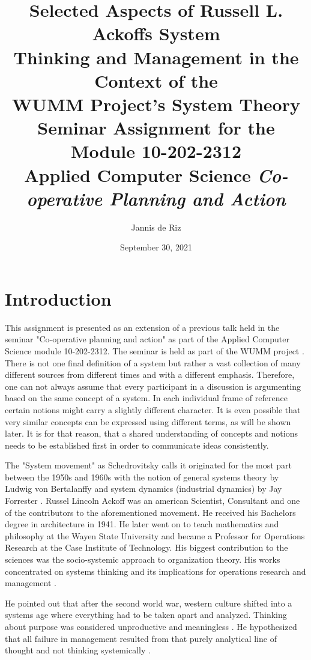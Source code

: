 \documentclass[a4paper,11pt]{article}
\title{Selected Aspects of Russell L. Ackoffs System\\ Thinking and Management
  in the Context of the\\ WUMM Project's System Theory\\[2em] \large Seminar
  Assignment for the Module 10-202-2312\\ Applied Computer Science
  \emph{Co-operative Planning and Action}}
\author{Jannis de Riz}
\date{September 30, 2021}
\begin{document}
\maketitle
\vfill
\tableofcontents
\newpage
\section{Introduction}
This assignment is presented as an extension of a previous talk held in the
seminar "Co-operative planning and action" as part of the Applied Computer
Science module 10-202-2312. The seminar is held as part of the WUMM project
\cite{wumm_project}. There is not one final definition of a system but rather
a vast collection of many different sources from different times and with a
different emphasis. Therefore, one can not always assume that every
participant in a discussion is argumenting based on the same concept of a
system. In each individual frame of reference certain notions might carry a
slightly different character. It is even possible that very similar concepts
can be expressed using different terms, as will be shown later. It is for that
reason, that a shared understanding of concepts and notions needs to be
established first in order to communicate ideas consistently.

The "System movement" as Schedrovitsky calls it
\cite{shchedrovitsky1981principles} originated for the most part between the
1950s and 1960s with the notion of general systems theory by Ludwig von
Bertalanffy and system dynamics (industrial dynamics) by Jay Forrester
\cite{von1956general} \cite{forrester1994system}
\cite{forrester1997industrial} \cite{forrester1968industrial}.  Russel Lincoln
Ackoff was an american Scientist, Consultant and one of the contributors to
the aforementioned movement. He received his Bachelors degree in architecture
in 1941. He later went on to teach mathematics and philosophy at the Wayen
State University and became a Professor for Operations Research at the Case
Institute of Technology. His biggest contribution to the sciences was the
socio-systemic approach to organization theory. His works concentrated on
systems thinking and its implications for operations research and management
\cite{ackoff1972note} \cite{ackoff1989data} \cite{sengupta1965systems}
\cite{ackoff2006few}.

He pointed out that after the second world war, western culture shifted into a
systems age where everything had to be taken apart and analyzed. Thinking
about purpose was considered unproductive and meaningless
\cite{ackoff1972note}. He hypothesized that all failure in management resulted
from that purely analytical line of thought and not thinking systemically
\cite{shortspeech}.
\end{document}
